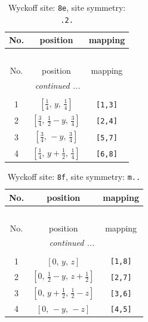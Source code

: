 \documentclass[fleqn,8pt]{jsarticle}
\begin{document}
\renewcommand{\arraystretch}{1.2}
\begin{longtable}{ccc}
\caption{Wyckoff site: {\tt 8e}, site symmetry: {\tt .2.}}
 \\
 \hline \hline
No. & position & mapping \\ \hline \endfirsthead

\multicolumn{2}{l}{\tablename\ \thetable{}} \\
 \hline \hline
No. & position & mapping \\ \hline \endhead

 \hline \hline
\multicolumn{2}{r}{\footnotesize\it continued ...} \\ \endfoot

 \hline \hline
\multicolumn{2}{r}{} \\ \endlastfoot

1 & $\left[ \frac{1}{4},\, y,\, \frac{1}{4} \right]$ & {\tt [1,3]} \\ \hline
2 & $\left[ \frac{3}{4},\, \frac{1}{2} - y,\, \frac{3}{4} \right]$ & {\tt [2,4]} \\ \hline
3 & $\left[ \frac{3}{4},\, - y,\, \frac{3}{4} \right]$ & {\tt [5,7]} \\ \hline
4 & $\left[ \frac{1}{4},\, y + \frac{1}{2},\, \frac{1}{4} \right]$ & {\tt [6,8]} \\
\end{longtable}
\renewcommand{\arraystretch}{1.2}
\begin{longtable}{ccc}
\caption{Wyckoff site: {\tt 8f}, site symmetry: {\tt m..}}
 \\
 \hline \hline
No. & position & mapping \\ \hline \endfirsthead

\multicolumn{2}{l}{\tablename\ \thetable{}} \\
 \hline \hline
No. & position & mapping \\ \hline \endhead

 \hline \hline
\multicolumn{2}{r}{\footnotesize\it continued ...} \\ \endfoot

 \hline \hline
\multicolumn{2}{r}{} \\ \endlastfoot

1 & $\left[ 0,\, y,\, z \right]$ & {\tt [1,8]} \\ \hline
2 & $\left[ 0,\, \frac{1}{2} - y,\, z + \frac{1}{2} \right]$ & {\tt [2,7]} \\ \hline
3 & $\left[ 0,\, y + \frac{1}{2},\, \frac{1}{2} - z \right]$ & {\tt [3,6]} \\ \hline
4 & $\left[ 0,\, - y,\, - z \right]$ & {\tt [4,5]} \\
\end{longtable}
\end{document}
